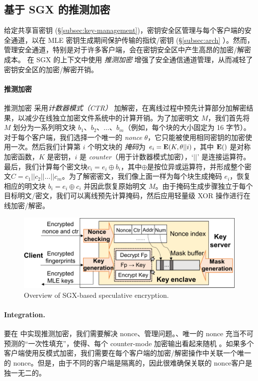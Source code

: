 \subsection{基于 SGX 的推测加密}
\label{subsec:encryption}

给定共享盲密钥 (\S\ref{subsec:key-management})，密钥安全区管理与每个客户端的安全通道，以在 MLE 密钥生成期间保护传输的指纹/密钥 (\S\ref{subsec:arch} ）。然而，管理安全通道，特别是对于许多客户端，会在密钥安全区中产生高昂的加密/解密成本。 \sysname 在 SGX 的上下文中使用 \textit{ 推测加密} \cite{eduardo19} 增强了安全通信通道管理，从而减轻了密钥安全区的加密/解密开销。

\paragraph{推测加密} 推测加密 \cite{eduardo19} 采用\textit{计数器模式（CTR）} \cite{counter} 加解密，在离线过程中预先计算部分加解密结果，以减少在线独立加密文件系统中的计算开销。为了加密明文 $M$，我们首先将 $M$ 划分为一系列明文块 $b_1、b_2、\ldots、b_m$（例如，每个块的大小固定为 16 字节）。对于每个客户端，我们选择一个唯一的 \textit{ nonce} $\theta$，它只能被使用相同密钥的加密使用一次。然后我们计算第 $i$ 个明文块的 \textit{掩码}为 $e_i = {\bf E}(K, \theta || i)$，其中 ${\bf E}()$ 是对称加密函数，$K$ 是密钥，$i$ 是 \textit{ counter}（用于计数器模式加密），`$||$' 是连接运算符。最后，我们计算每个密文块$c_i = e_i \oplus b_i $，其中$\oplus$是按位异或运算符，并形成整个密文$C = c_1 || c_2 || \ldots || c_m$。为了解密密文，我们像上面一样为每个块生成掩码 $e_i$，恢复相应的明文块 $b_i = e_i \oplus c_i$ 并因此恢复原始明文 $M$。由于掩码生成步骤独立于每个目标明文/密文，我们可以离线预先计算掩码，然后应用轻量级 XOR 操作进行在线加密/解密。

\begin{figure}[t]
\centering
\includegraphics[width=\textwidth]{pic/sgxdedup/encryption.pdf}
\caption{Overview of SGX-based speculative encryption.}
\label{fig:SpecEnc}
\end{figure}

\paragraph{Integration.} 要在 \sysname 中实现推测加密，我们需要解决 nonce、管理问题。、唯一的 nonce 充当不可预测的“一次性填充”，使得、每个 counter-mode 加密输出看起来随机 \cite{counter}。如果多个客户端使用反模式加密，我们需要在每个客户端的加密/解密操作中关联一个唯一的 nonce。但是，由于不同的客户端是隔离的，因此很难确保关联的 nonce客户是独一无二的。

